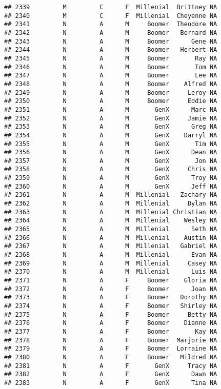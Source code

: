 \documentclass[
]{article}
\begin{document}
\begin{verbatim}
## 2339         M         C      F  Millenial  Brittney NA
## 2340         M         C      F  Millenial  Cheyenne NA
## 2341         N         A      M     Boomer  Theodore NA
## 2342         N         A      M     Boomer   Bernard NA
## 2343         N         A      M     Boomer      Gene NA
## 2344         N         A      M     Boomer   Herbert NA
## 2345         N         A      M     Boomer       Ray NA
## 2346         N         A      M     Boomer       Tom NA
## 2347         N         A      M     Boomer       Lee NA
## 2348         N         A      M     Boomer    Alfred NA
## 2349         N         A      M     Boomer     Leroy NA
## 2350         N         A      M     Boomer     Eddie NA
## 2351         N         A      M       GenX      Marc NA
## 2352         N         A      M       GenX     Jamie NA
## 2353         N         A      M       GenX      Greg NA
## 2354         N         A      M       GenX    Darryl NA
## 2355         N         A      M       GenX       Tim NA
## 2356         N         A      M       GenX      Dean NA
## 2357         N         A      M       GenX       Jon NA
## 2358         N         A      M       GenX     Chris NA
## 2359         N         A      M       GenX      Troy NA
## 2360         N         A      M       GenX      Jeff NA
## 2361         N         A      M  Millenial   Zachary NA
## 2362         N         A      M  Millenial     Dylan NA
## 2363         N         A      M  Millenial Christian NA
## 2364         N         A      M  Millenial    Wesley NA
## 2365         N         A      M  Millenial      Seth NA
## 2366         N         A      M  Millenial    Austin NA
## 2367         N         A      M  Millenial   Gabriel NA
## 2368         N         A      M  Millenial      Evan NA
## 2369         N         A      M  Millenial     Casey NA
## 2370         N         A      M  Millenial      Luis NA
## 2371         N         A      F     Boomer    Gloria NA
## 2372         N         A      F     Boomer      Joan NA
## 2373         N         A      F     Boomer   Dorothy NA
## 2374         N         A      F     Boomer   Shirley NA
## 2375         N         A      F     Boomer     Betty NA
## 2376         N         A      F     Boomer    Dianne NA
## 2377         N         A      F     Boomer       Kay NA
## 2378         N         A      F     Boomer  Marjorie NA
## 2379         N         A      F     Boomer  Lorraine NA
## 2380         N         A      F     Boomer   Mildred NA
## 2381         N         A      F       GenX     Tracy NA
## 2382         N         A      F       GenX      Dawn NA
## 2383         N         A      F       GenX      Tina NA

\end{verbatim}
\end{document}
